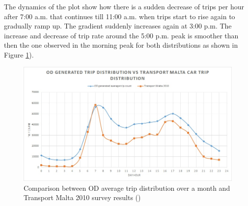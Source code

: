 \documentclass[12pt, a4paper]{report}
\theoremstyle{definition}
\theoremstyle{definition}%
\theoremstyle{definition}%
\theoremstyle{definition}%
\theoremstyle{definition}%
\theoremstyle{definition}%
\begin{document}
\begin{table}[!] 	
	\centering
	\caption[NHTS and OD trip distributions correlation statistics]{NHTS and OD trip distributions proved to be highly correlated. $ ^* p < 0.001$  } 
	\label{table:trip_dsitribution_statistical_analysis}	
\end{table}

The dynamics of the plot show how there is a sudden decrease of trips per hour after 7:00 a.m. that continues till 11:00 a.m. when trips start to rise again to gradually ramp up. The gradient suddenly increases again at 3:00 p.m. The increase and decrease of trip rate around the 5:00 p.m. peak is smoother than then the one observed in the morning peak for both distributions as shown in Figure \ref{fig:trip_count_correlation}). 


\begin{figure}[!]	
	\includegraphics[scale=0.6]{Trip_count_correlation.jpg}
	\centering
	\caption[Comparison between NHTS and OD average trip distribution ]{Comparison between OD average trip distribution over a month and Transport Malta 2010 survey results (\cite{malta2011national})}
	\label{fig:trip_count_correlation}
\end{figure}
\end{document}
